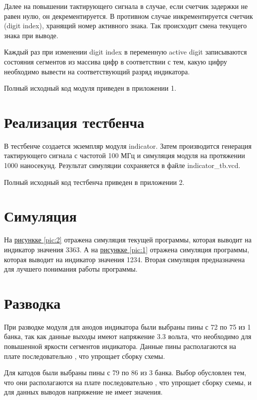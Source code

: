 Далее на повышении тактирующего сигнала в случае, если счетчик задержки не равен нулю, он декрементируется. В противном случае инкрементируется счетчик (digit index), хранящий номер активного знака. 
Так происходит смена текущего знака при выводе.

Каждый раз при изменении digit index в переменную active digit записываются состояния сегментов из массива цифр в соответствии с тем, какую цифру необходимо вывести на соответствующий разряд индикатора.

Полный исходный код модуля приведен в приложении 1.

\section{Реализация тестбенча}

В тестбенче создается экземпляр модуля indicator.
Затем производится генерация тактирующего сигнала с частотой 100 МГц и симуляция модуля на протяжении 1000 наносекунд.
Результат симуляции сохраняется в файле indicator\_tb.vcd.

Полный исходный код тестбенча приведен в приложении 2.

\section{Симуляция}
На \hyperref[pic:2]{рисункке \ref*{pic:2}} отражена симуляция текущей программы, которая выводит на индикатор значения 3363.
А на \hyperref[pic:1]{рисункке \ref*{pic:1}} отражена симуляция программы, которая выводит на индикатор значения 1234.
Вторая симуляция предназначена для лучшего понимания работы программы.


\section{Разводка}

При разводке модуля для анодов индикатора были выбраны пины с 72 по 75 из 1 банка, так как данные выходы имеют напряжение 3.3 вольта, что необходимо для повышенной яркости сегментов индикатора. Данные пины располагаются на плате последовательно , что упрощает сборку схемы.

Для катодов были выбраны пины с 79 по 86 из 3 банка. Выбор обусловлен тем, что они располагаются на плате последовательно , что упрощает сборку схемы, и для данных выводов напряжение не имеет значения.

